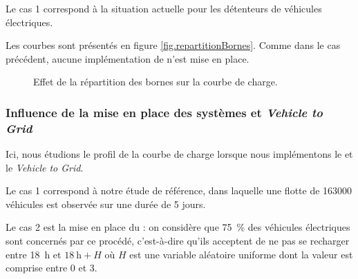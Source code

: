 				Le cas 1 correspond à la situation actuelle pour les détenteurs de véhicules électriques.
				
				Les courbes sont présentés en figure \vref{fig.repartitionBornes}. Comme dans le cas précédent, aucune implémentation de \smartgrid{} n'est mise en place.
				
				\begin{figure}[!h]
					\centering
					\caption{Effet de la répartition des bornes sur la courbe de charge. \label{fig.repartitionBornes}}
				\end{figure}
				
				
				
				\subsubsection{Influence de la mise en place des systèmes \smartgrid{} et \emph{Vehicle to Grid}}
				
				Ici, nous étudions le profil de la courbe de charge lorsque nous implémentons le \smartgrid{} et le \emph{Vehicle to Grid}.
				
				Le cas 1 correspond à notre étude de référence, dans laquelle une flotte de 163000 véhicules est observée sur une durée de 5 jours.
				
				Le cas 2 est la mise en place du \smartgrid{}: on considère que \SI{75}{\percent} des véhicules électriques sont concernés par ce procédé, c'est-à-dire qu'ils acceptent de ne pas se recharger entre \SI{18}{\hour} et $\SI{18}{\hour}+H$ où $H$ est une variable aléatoire uniforme dont la valeur est comprise entre 0 et 3.
				
